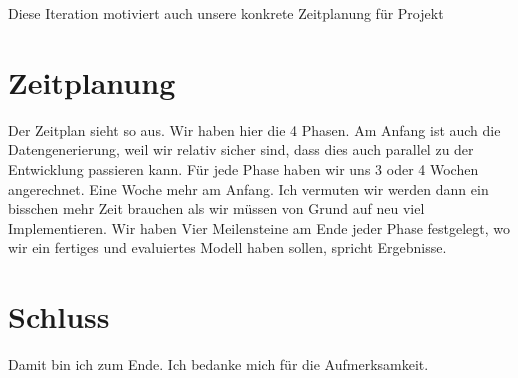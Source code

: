 \documentclass[margin=0.05in, tmargin=0.01in]{article}
\begin{document}
Diese Iteration motiviert auch unsere konkrete Zeitplanung für Projekt


\section{Zeitplanung}
\label{sec:org6c62664}
Der Zeitplan sieht so aus. Wir haben hier die 4 Phasen. Am Anfang ist auch die Datengenerierung, weil wir relativ sicher sind, dass dies auch parallel zu der Entwicklung passieren kann. Für jede Phase haben wir uns 3 oder 4 Wochen angerechnet. Eine Woche mehr am Anfang. Ich vermuten wir werden dann ein bisschen mehr Zeit brauchen als wir müssen von Grund auf neu viel Implementieren. Wir haben Vier Meilensteine am Ende jeder Phase festgelegt, wo wir ein fertiges und evaluiertes Modell haben sollen, spricht Ergebnisse.


\section{Schluss}
\label{sec:orgcfac6d1}
Damit bin ich zum Ende. Ich bedanke mich für die Aufmerksamkeit.
\end{document}
